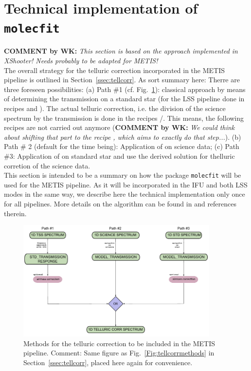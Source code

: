 \section{Technical implementation of \texttt{molecfit}}\label{app:mf}
\textbf{COMMENT by WK:} \textit{This section is based on the approach implemented in XShooter! Needs probably to be adapted for METIS!}\\[0.5cm]

The overall strategy for the telluric correction incorporated in the METIS pipeline is outlined in Section~\ref{ssec:tellcorr}. As sort summary here: Therre are three foreseen possibilities: (a) Path \#1 (cf. Fig.~\ref{Fig:tellcorrmethods2}): classical approach by means of determining the transmission on a standard star (for the LSS pipeline done in recipes  and ). The actual telluric correction, i.e. the division of the science spectrum by the transmission is done in the recipes /. This means, the following recipes are not carried out anymore (\textbf{COMMENT by WK:} \textit{We could think about shifting that part to the recipe , which aims to exactly do that step...}). (b) Path \# 2 (default for the time being): Application of \mf on science data; (c) Path \#3: Application of \mf on standard star and use the derived solution for thelluric corretion of the science data.\\
This section is intended to be a summary on how the package \texttt{molecfit} will be used for the \ac{METIS} pipeline. As it will be incorporated in the \ac{IFU} and both \ac{LSS} modes in the same way, we describe here the technical implementation only once for all pipelines. More details on the \mf algorithm can be found in \cite{molecfit} and references therein.
\begin{figure}[ht]
  \centering
  \includegraphics[width=0.9\textwidth]{figures/tell_corr_methods.pdf}
    \caption[Methods for the telluric correction to be included in the METIS pipeline]{%
        Methods for the telluric correction to be included in the \ac{METIS} pipeline. Comment: Same figure as Fig.~\ref{Fig:tellcorrmethods} in Section~\ref{ssec:tellcorr}, placed here again for convenience. }
  \label{Fig:tellcorrmethods2}
\end{figure}

